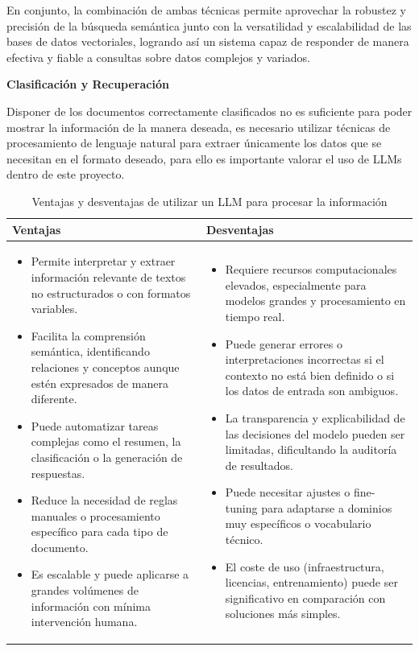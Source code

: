 \documentclass{article}
\begin{document}
\begin{enumerate}
    En conjunto, la combinación de ambas técnicas permite aprovechar la robustez y precisión de la búsqueda semántica junto con la versatilidad y escalabilidad de las bases de datos vectoriales, logrando así un sistema capaz de responder de manera efectiva y fiable a consultas sobre datos complejos y variados.
    
    \textbf{Clasificación y Recuperación}
    
    Disponer de los documentos correctamente clasificados no es suficiente para poder mostrar la información de la manera deseada, es necesario utilizar técnicas de procesamiento de lenguaje natural para extraer únicamente los datos que se necesitan en el formato deseado, para ello es importante valorar el uso de LLMs dentro de este proyecto. 

    \begin{table}[H]
    \centering
    \begin{tabular}{p{6.75cm}|p{6.75cm}}
    \textbf{Ventajas} & \textbf{Desventajas} \\
    \hline
    \begin{itemize}[left=0.15pt]
        \item Permite interpretar y extraer información relevante de textos no estructurados o con formatos variables.
        \item Facilita la comprensión semántica, identificando relaciones y conceptos aunque estén expresados de manera diferente.
        \item Puede automatizar tareas complejas como el resumen, la clasificación o la generación de respuestas.
        \item Reduce la necesidad de reglas manuales o procesamiento específico para cada tipo de documento.
        \item Es escalable y puede aplicarse a grandes volúmenes de información con mínima intervención humana.
    \end{itemize}
    &
    \begin{itemize}[left=0.15pt]
        \item Requiere recursos computacionales elevados, especialmente para modelos grandes y procesamiento en tiempo real.
        \item Puede generar errores o interpretaciones incorrectas si el contexto no está bien definido o si los datos de entrada son ambiguos.
        \item La transparencia y explicabilidad de las decisiones del modelo pueden ser limitadas, dificultando la auditoría de resultados.
        \item Puede necesitar ajustes o fine-tuning para adaptarse a dominios muy específicos o vocabulario técnico.
        \item El coste de uso (infraestructura, licencias, entrenamiento) puede ser significativo en comparación con soluciones más simples.
    \end{itemize}
    \end{tabular}
    \caption{Ventajas y desventajas de utilizar un LLM para procesar la información}
    \end{table}


\end{enumerate}
\end{document}

